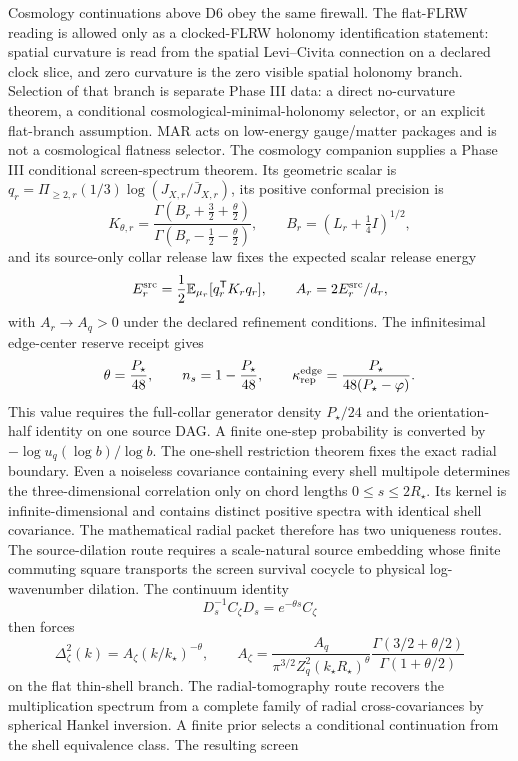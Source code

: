 \documentclass[11pt]{article}
\begin{document}
Cosmology continuations above D6 obey the same firewall. The flat-FLRW reading is allowed only as a
clocked-FLRW holonomy identification statement: spatial curvature is read from the spatial
Levi--Civita connection on a declared clock slice, and zero curvature is the zero visible spatial
holonomy branch. Selection of that branch is separate Phase III data: a direct no-curvature theorem,
a conditional cosmological-minimal-holonomy selector, or an explicit flat-branch assumption. MAR
acts on low-energy gauge/matter packages and is not a cosmological flatness selector. The
cosmology companion supplies a Phase III conditional screen-spectrum theorem. Its geometric
scalar is
\(q_r=\Pi_{\ge2,r}(1/3)\log(J_{X,r}/\bar J_{X,r})\), its positive conformal precision is
\[
K_{\theta,r}=\frac{\Gamma(B_r+\frac32+\frac\theta2)}
{\Gamma(B_r-\frac12-\frac\theta2)},\qquad
B_r=(L_r+\tfrac14I)^{1/2},
\]
and its source-only collar release law fixes the expected scalar release energy
\[
E_r^{\rm src}=\frac12\mathbb E_{\mu_r}[q_r^{\mathsf T}K_rq_r],\qquad
A_r=2E_r^{\rm src}/d_r,
\]
with \(A_r\to A_q>0\) under the declared refinement conditions. The infinitesimal edge-center
reserve receipt gives
\[
\theta=\frac{P_\star}{48},\qquad
n_s=1-\frac{P_\star}{48},\qquad
\kappa_{\rm rep}^{\rm edge}=\frac{P_\star}{48(P_\star-\varphi)}.
\]
This value requires the full-collar generator density \(P_\star/24\) and the orientation-half
identity on one source DAG. A finite one-step probability is converted by
\(-\log u_q(\log b)/\log b\). The one-shell restriction theorem fixes the exact radial boundary.
Even a noiseless covariance containing every shell multipole determines the three-dimensional
correlation only on chord lengths \(0\le s\le2R_\star\). Its kernel is infinite-dimensional and
contains distinct positive spectra with identical shell covariance. The mathematical radial packet
therefore has two uniqueness routes. The source-dilation route requires a scale-natural source
embedding whose finite commuting square transports the screen survival cocycle to physical
log-wavenumber dilation. The continuum identity
\[
D_s^{-1}C_\zeta D_s=e^{-\theta s}C_\zeta
\]
then forces
\[
\Delta_\zeta^2(k)=A_\zeta(k/k_\star)^{-\theta},\qquad
A_\zeta=\frac{A_q}{\pi^{3/2}Z_q^2(k_\star R_\star)^\theta}
\frac{\Gamma(3/2+\theta/2)}{\Gamma(1+\theta/2)}
\]
on the flat thin-shell branch. The radial-tomography route recovers the multiplication spectrum
from a complete family of radial cross-covariances by spherical Hankel inversion. A finite prior
selects a conditional continuation from the shell equivalence class. The resulting screen
\end{document}

